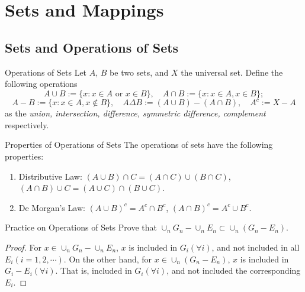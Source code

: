 
\section{Sets and Mappings}

\subsection{Sets and Operations of Sets}

\begin{definition}{Operations of Sets}{}
  Let $A$, $B$ be two sets,
  and $X$ the universal set.
  Define the following operations
  \begin{equation}
    A \cup B := \{x: x \in A \text{ or } x \in B\}, \quad
    A \cap B := \{x: x \in A, x \in B\};
  \end{equation}
  \begin{equation}
    A - B := \{x: x \in A, x \not\in B\}, \quad
    A \Delta B := (A \cup B) - (A \cap B), \quad
    A^c := X - A
  \end{equation}
  as the \emph{union, intersection, difference, symmetric difference, complement} respectively.
\end{definition}

\begin{proposition}{Properties of Operations of Sets}{}
  The operations of sets have the following properties:
  \begin{enumerate}
  \item Distributive Law: $(A \cup B)\cap C = (A \cap C) \cup (B \cap C)$,
    $(A \cap B) \cup C = (A \cup C) \cap (B \cup C)$.
  \item De Morgan's Law: $(A\cup B)^c = A^c \cap B^c$, $(A \cap B)^c = A^c \cup B^c$.
  \end{enumerate}
\end{proposition}

\begin{example}{Practice on Operations of Sets}{}
  Prove that $\cup_n G_n - \cup_n E_n \subset \cup_n (G_n - E_n)$.
\end{example}

\begin{proof}
  For $x \in \cup_n G_n - \cup_n E_n$,
  $x$ is included in $G_i(\forall i)$, and not included in all $E_i(i=1,2,\cdots)$.
  On the other hand, for $x \in \cup_n (G_n - E_n)$,
  $x$ is included in $G_i - E_i(\forall i)$.
  That is, included in $G_i (\forall i)$, and not included the corresponding $E_i$.
\end{proof}


